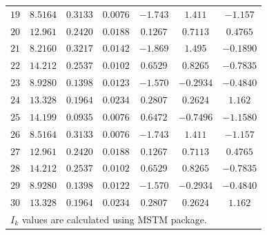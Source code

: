 \documentclass[final, 3p]{elsarticle}
\begin{document}
\begin{table}[h]
\begin{center}
\begin{tabular}{|c|c|c|c|c|c|c|}
			$19$ & $8.5164$ & $0.3133$ & $0.0076$ & $-1.743$ & $1.411$ & $-1.157$ \\
			$20$ & $12.961$ & $0.2420$ & $0.0188$ & $0.1267$ & $0.7113$ & $0.4765$ \\
			$21$ & $8.2160$ & $0.3217$ & $0.0142$ & $-1.869$ & $1.495$ & $-0.1890$ \\
			$22$ & $14.212$ & $0.2537$ & $0.0102$ & $0.6529$ & $0.8265$ & $-0.7835$ \\
			$23$ & $8.9280$ & $0.1398$ & $0.0123$ & $-1.570$ &	$-0.2934$ & $-0.4840$ \\
			$24$ & $13.328$ & $0.1964$ & $0.0234$ & $0.2807$ & $0.2624$ & $1.162$ \\
			$25$ & $14.199$ & $0.0935$ & $0.0076$ & $0.6472$ & $-0.7496$ & $-1.1580$ \\
			$26$ & $8.5164$ & $0.3133$ & $0.0076$ & $-1.743$	& $1.411$ & $-1.157$ \\
			$27$ & $12.961$ & $0.2420$ & $0.0188$ & $0.1267$	& $0.7113$ & $0.4765$ \\
			$28$ & $14.212$ & $0.2537$ & $0.0102$ & $0.6529$ & $0.8265$ & $-0.7835$ \\
			$29$ & $8.9280$ & $0.1398$ & $0.0122$ & $-1.570$ &	$-0.2934$ & $-0.4840$ \\
			$30$ & $13.328$ & $0.1964$ & $0.0234$ & $0.2807$ & $0.2624$ & $1.162$ \\
			\hline\hline
			\multicolumn{7}{l}{\small *$I_k$ values are calculated using MSTM package.}
		\end{tabular}
	\end{center}
\end{table}
\end{document}
